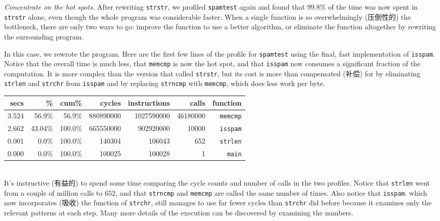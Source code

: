 \emph{Concentrate on the hot spots.} After rewriting \verb'strstr', we
profiled \verb'spamtest' again and found that 99.8\% of the time was now
spent in \verb'strstr' alone, even though the whole program was
considerable faster. When a single function is so overwhelmingly (压倒性的)
the bottleneck, there are only two ways to go: improve the function to use
a better algorithm, or eliminate the function altogether by rewriting the
surrounding program.

In this case, we rewrote the program. Here are the first few lines of the
profile for \verb'spamtest' using the final, fast implementation of
\verb'isspam'. Notice that the overall time is much less, that
\verb'memcmp' is now the hot spot, and that \verb'isspam' now consumes a
significant fraction of the computation. It is more complex than the
version that called \verb'strstr', but its cost is more than compensated
(补偿) for by eliminating \verb'strlen' and \verb'strchr' from
\verb'isspam' and by replacing \verb'strncmp' with \verb'memcmp', which
does less work per byte.
\begin{tabular}{rrrrrrr}
    secs    & \%    & cum\% & cycles    & instructions  & calls & function
    \\
    \hline
    \hline
    3.524   & 56.9\%    & 56.9\%    & 880890000 & 1027590000    & 46180000
    & \verb'memcmp' \\
    2.662   & 43.04\%   & 100.0\%   & 665550000 & 902920000     & 10000
    & \verb'isspam' \\
    0.001   & 0.0\%     & 100.0\%   & 140304    & 106043        & 652
    & \verb'strlen' \\
    0.000   & 0.0\%     & 100.0\%   & 100025    & 100028        & 1
    & \verb'main'   \\
\end{tabular} \\

It's instructive (有益的) to spend some time comparing the cycle counts and
number of calls in the two profiles. Notice that \verb'strlen' went from a
couple of million calls to 652, and that \verb'strncmp' and \verb'memcmp'
are called the same number of times. Also notice that \verb'isspam'. which
now incorporates (吸收) the function of \verb'strchr', still manages to use
far fewer cycles than \verb'strchr' did before because it examines only the
relevant patterns at each step. Many more details of the execution can be
discovered by examining the numbers.

